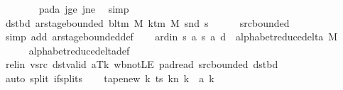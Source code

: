 \begin{isabellebody}
\ \ \ \ \ \ \isamarkupfalse%
\ pad{\isacharunderscore}{\kern0pt}a\ jge\ jne\ \isamarkupfalse%
\ simp\isanewline
\ \ \isamarkupfalse%
\isanewline
\ \ \isamarkupfalse%
\ dst{\isacharunderscore}{\kern0pt}bd{\isacharcolon}{\kern0pt}\ {\isachardoublequoteopen}ar{\isacharunderscore}{\kern0pt}stage{\isacharunderscore}{\kern0pt}bounded\ {\isacharparenleft}{\kern0pt}bl{\isacharunderscore}{\kern0pt}tm\ M{\isacharparenright}{\kern0pt}\ {\isacharparenleft}{\kern0pt}k{\isacharunderscore}{\kern0pt}tm\ M{\isacharparenright}{\kern0pt}\ {\isacharparenleft}{\kern0pt}snd\ {\isacharquery}{\kern0pt}s{\isacharprime}{\kern0pt}{\isacharparenright}{\kern0pt}{\isachardoublequoteclose}\isanewline
\ \ \ \ \isamarkupfalse%
\ src{\isacharunderscore}{\kern0pt}bounded\ \isamarkupfalse%
\ {\isacharparenleft}{\kern0pt}simp\ add{\isacharcolon}{\kern0pt}\ ar{\isacharunderscore}{\kern0pt}stage{\isacharunderscore}{\kern0pt}bounded{\isacharunderscore}{\kern0pt}def{\isacharparenright}{\kern0pt}\isanewline
\ \ \isamarkupfalse%
\ ard{\isacharunderscore}{\kern0pt}in{\isacharcolon}{\kern0pt}\ {\isachardoublequoteopen}{\isacharparenleft}{\kern0pt}{\isacharquery}{\kern0pt}s{\isacharcomma}{\kern0pt}\ {\isacharquery}{\kern0pt}a{\isacharcomma}{\kern0pt}\ {\isacharquery}{\kern0pt}s{\isacharprime}{\kern0pt}{\isacharcomma}{\kern0pt}\ {\isacharquery}{\kern0pt}a{\isacharprime}{\kern0pt}{\isacharcomma}{\kern0pt}\ {\isacharquery}{\kern0pt}d{\isacharparenright}{\kern0pt}\ {\isasymin}\ alphabet{\isacharunderscore}{\kern0pt}reduce{\isacharunderscore}{\kern0pt}delta\ M{\isachardoublequoteclose}\isanewline
\ \ \ \ \isamarkupfalse%
\ alphabet{\isacharunderscore}{\kern0pt}reduce{\isacharunderscore}{\kern0pt}delta{\isacharunderscore}{\kern0pt}def\isanewline
\ \ \ \ \isamarkupfalse%
\ rel{\isacharunderscore}{\kern0pt}in\ vsrc\ dst{\isacharunderscore}{\kern0pt}valid\ aTk\ wb{\isacharunderscore}{\kern0pt}not{\isacharunderscore}{\kern0pt}LE\ pad{\isacharunderscore}{\kern0pt}read\ src{\isacharunderscore}{\kern0pt}bounded\ dst{\isacharunderscore}{\kern0pt}bd\isanewline
\ \ \ \ \isamarkupfalse%
\ {\isacharparenleft}{\kern0pt}auto\ split{\isacharcolon}{\kern0pt}\ if{\isacharunderscore}{\kern0pt}splits{\isacharparenright}{\kern0pt}\isanewline
\ \ \isamarkupfalse%
\ tape{\isacharunderscore}{\kern0pt}new{\isacharcolon}{\kern0pt}\ {\isachardoublequoteopen}{\isacharparenleft}{\kern0pt}{\isasymlambda}k{\isachardot}{\kern0pt}\ {\isacharparenleft}{\kern0pt}ts\ k{\isacharparenright}{\kern0pt}{\isacharparenleft}{\kern0pt}n\ k\ {\isacharcolon}{\kern0pt}{\isacharequal}{\kern0pt}\ {\isacharquery}{\kern0pt}a{\isacharprime}{\kern0pt}\ k{\isacharparenright}{\kern0pt}{\isacharparenright}{\kern0pt}\isanewline

\end{isabellebody}
